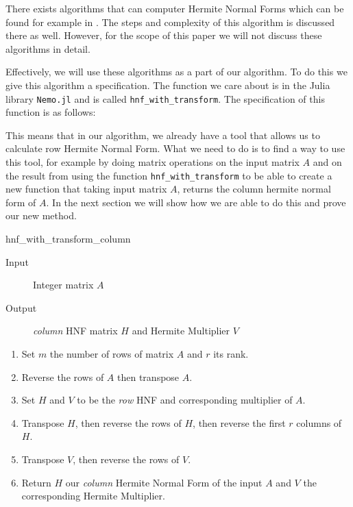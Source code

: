 \documentclass[oneside, a4paper, onecolumn, 11pt]{article}
\begin{document}
There exists algorithms that can computer Hermite Normal Forms which can be found for example in \cite{cohen2013course}. The steps and complexity of this algorithm is discussed there as well. However, for the scope of this paper we will not discuss these algorithms in detail.

Effectively, we will use these algorithms as a part of our algorithm. To do this we give this algorithm a specification. The function we care about is in the Julia library \texttt{Nemo.jl} \cite{nemo} and is called \texttt{hnf\_with\_transform}. The specification of this function is as follows:

This means that in our algorithm, we already have a tool that allows us to calculate row Hermite Normal Form. What we need to do is to find a way to use this tool, for example by doing matrix operations on the input matrix \(A\) and on the result from using the function \texttt{hnf\_with\_transform} to be able to create a new function that taking input matrix \(A\), returns the column hermite normal form of \(A\). In the next section we will show how we are able to do this and prove our new method.

\newpage

\begin{algorithm}[H]
    \caption{hnf\_with\_transform\_column}

    \begin{description}
        \item[Input] Integer matrix \(A\)
        \item[Output] \textit{column} HNF matrix \(H\) and Hermite Multiplier \(V\)
    \end{description}

    \begin{enumerate}[label = \textbf{(Step~\arabic*)}, leftmargin=*, align=left, labelsep=2pt, itemsep=0pt]
        \item Set \(m\) the number of rows of matrix \(A\) and \(r\) its rank.
        \item Reverse the rows of \(A\) then transpose \(A\).
        \item Set \(H\) and \(V\) to be the \textit{row} HNF and corresponding multiplier of \(A\).
        \item Transpose \(H\), then reverse the rows of \(H\), then reverse the first \(r\) columns of \(H\).
        \item Transpose \(V\), then reverse the rows of \(V\).
        \item Return \(H\) our \textit{column} Hermite Normal Form of the input \(A\) and \(V\) the corresponding Hermite Multiplier.
    \end{enumerate}
\end{algorithm}
\end{document}
